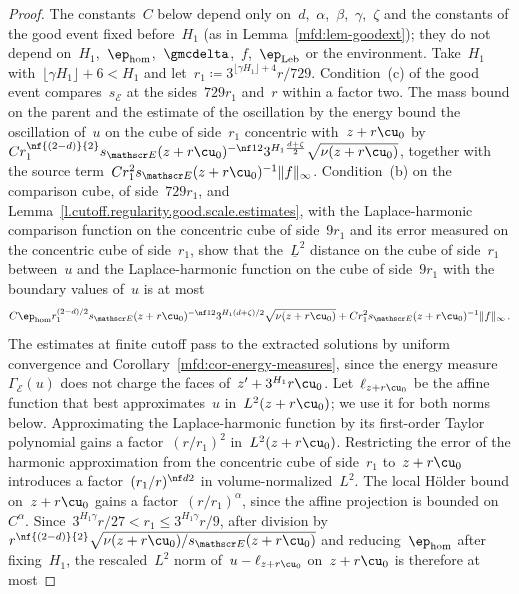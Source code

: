 \documentclass[11pt]{amsart}
\begin{document}
\begin{proof}
The constants~$C$ below depend only on~$d$,~$\alpha$,~$\beta$,~$\gamma$,~$\zeta$ and the constants of the good event fixed before~$H_1$ (as in Lemma~\ref{mfd:lem-goodext}); they do not depend on~$H_1$,~$\ep_{\rm hom}$,~$\gmcdelta$,~$f$,~$\ep_{\rm Leb}$ or the environment. Take~$H_1$ with~$\lfloor\gamma H_1\rfloor+6<H_1$ and let~$r_1\coloneqq3^{\lfloor\gamma H_1\rfloor+4}r/729$. Condition~(c) of the good event compares~$s_{\mathscr E}$ at the sides~$729r_1$ and~$r$ within a factor two. The mass bound on the parent and the estimate of the oscillation by the energy bound the oscillation of~$u$ on the cube of side~$r_1$ concentric with~$z+r\cu_0$ by~$Cr_1^{\nf{(2-d)}{2}}s_{\mathscr E}(z+r\cu_0)^{-\nf12}3^{H_1\frac{d+\zeta}{2}}\sqrt{\nu(z+r\cu_0)}$, together with the source term~$Cr_1^2s_{\mathscr E}(z+r\cu_0)^{-1}\|f\|_\infty$. Condition~(b) on the comparison cube, of side~$729r_1$, and Lemma~\ref{l.cutoff.regularity.good.scale.estimates}, with the Laplace-harmonic comparison function on the concentric cube of side~$9r_1$ and its error measured on the concentric cube of side~$r_1$, show that the~$\underline L^2$ distance on the cube of side~$r_1$ between~$u$ and the Laplace-harmonic function on the cube of side~$9r_1$ with the boundary values of~$u$ is at most
\begin{equation*}
	C\ep_{\rm hom}r_1^{(2-d)/2}s_{\mathscr E}(z+r\cu_0)^{-\nf12}
	3^{H_1(d+\zeta)/2}\sqrt{\nu(z+r\cu_0)}
	+Cr_1^2s_{\mathscr E}(z+r\cu_0)^{-1}\|f\|_\infty\,.
\end{equation*}
The estimates at finite cutoff pass to the extracted solutions by uniform convergence and Corollary~\ref{mfd:cor-energy-measures}, since the energy measure~$\Gamma_{\mathscr E}(u)$ does not charge the faces of~$z'+3^{H_1}r\cu_0$. Let~$\ell_{z+r\cu_0}$ be the affine function that best approximates~$u$ in~$L^2(z+r\cu_0)$; we use it for both norms below. Approximating the Laplace-harmonic function by its first-order Taylor polynomial gains a factor~$(r/r_1)^2$ in~$L^2(z+r\cu_0)$. Restricting the error of the harmonic approximation from the concentric cube of side~$r_1$ to~$z+r\cu_0$ introduces a factor~$(r_1/r)^{\nf d2}$ in volume-normalized~$L^2$. The local H\"older bound on~$z+r\cu_0$ gains a factor~$(r/r_1)^\alpha$, since the affine projection is bounded on~$C^\alpha$. Since~$3^{H_1\gamma} r/27<r_1\leq 3^{H_1\gamma} r/9$, after division by~$r^{\nf{(2-d)}{2}}\sqrt{\nu(z+r\cu_0)/s_{\mathscr E}(z+r\cu_0)}$ and reducing~$\ep_{\rm hom}$ after fixing~$H_1$, the rescaled~$L^2$ norm of~$u-\ell_{z+r\cu_0}$ on~$z+r\cu_0$ is therefore at most

\end{proof}
\end{document}
